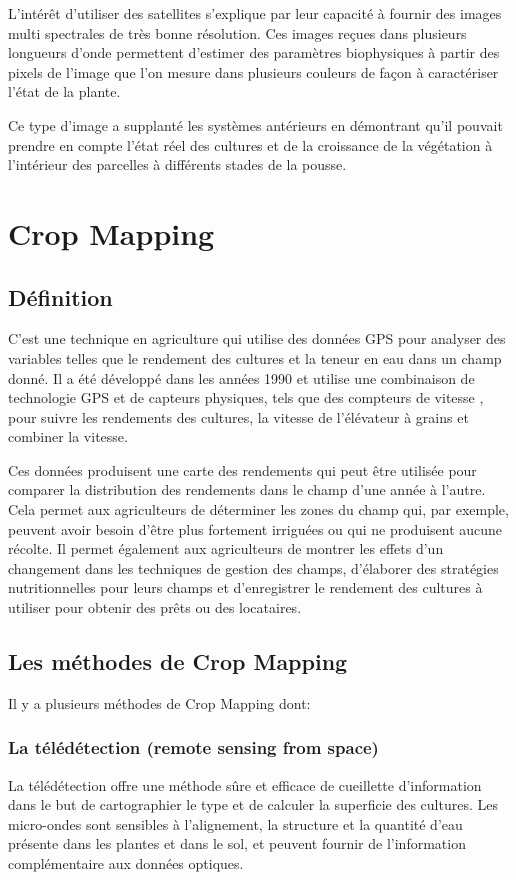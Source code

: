 \documentclass[12pt, openany]{report}
\begin{document}
L'intérêt d'utiliser des satellites s'explique par leur capacité à  fournir des images multi spectrales de très bonne résolution. Ces images reçues dans plusieurs longueurs d'onde permettent d'estimer des paramètres biophysiques à partir des pixels de l'image que l'on mesure dans plusieurs couleurs de façon à caractériser l'état de la plante.
\par
Ce type d'image a supplanté les systèmes antérieurs en démontrant qu'il pouvait prendre en compte l'état réel des cultures et de la croissance de la végétation à l'intérieur des parcelles à différents stades de la pousse.

\section{Crop Mapping}
\subsection{Définition}
C’est une technique en agriculture qui utilise des données GPS pour analyser des variables telles que le rendement des cultures et la teneur en eau dans un champ donné. Il a été développé dans les années 1990 et utilise une combinaison de technologie GPS et de capteurs physiques, tels que des compteurs de vitesse , pour suivre les rendements des cultures, la vitesse de l'élévateur à grains et combiner la vitesse.
\par
Ces données produisent une carte des rendements qui peut être utilisée pour comparer la distribution des rendements dans le champ d'une année à l'autre. Cela permet aux agriculteurs de déterminer les zones du champ qui, par exemple, peuvent avoir besoin d'être plus fortement irriguées ou qui ne produisent aucune récolte. Il permet également aux agriculteurs de montrer les effets d'un changement dans les techniques de gestion des champs, d'élaborer des stratégies nutritionnelles pour leurs champs et d'enregistrer le rendement des cultures à utiliser pour obtenir des prêts ou des locataires.

\subsection{Les méthodes de Crop Mapping}

Il y a plusieurs méthodes de Crop Mapping dont:

\subsubsection{La télédétection (remote sensing from space)}
La télédétection offre une méthode sûre et efficace de cueillette d'information dans le but de cartographier le type et de calculer la superficie des cultures.
Les micro-ondes sont sensibles à l'alignement, la structure et la quantité d'eau présente dans les plantes et dans le sol, et peuvent fournir de l'information complémentaire aux données optiques. 
\end{document}
